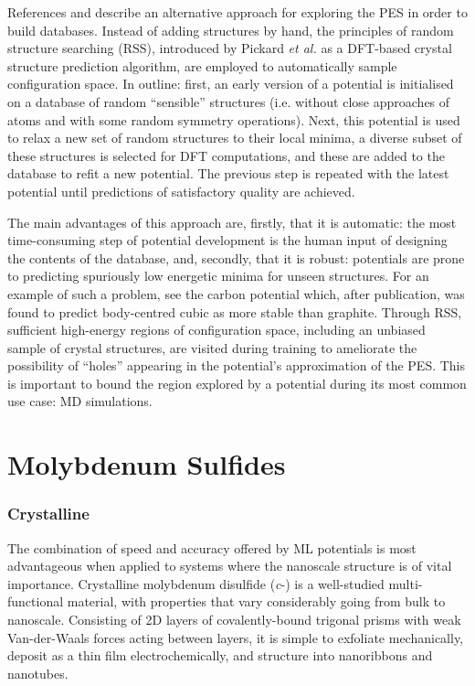 \documentclass[12pt,a4paper,twoside,nobind]{ociamthesis}
\begin{document}
References \cite{Deringer2018} and \cite{Bernstein2019b} describe an alternative approach for exploring the PES in order to build databases.
Instead of adding structures by hand, the principles of random structure searching (RSS), introduced by Pickard \emph{et al.} as a DFT-based crystal structure prediction algorithm,
are employed to automatically sample configuration space.\autocite{Pickard2006,Pickard2011} 
In outline: first, an early version of a potential is initialised on a database of random ``sensible''  structures (i.e. without close approaches of atoms and with some random
symmetry operations). 
Next, this potential is used to relax a new set of random structures to their local minima, a diverse subset of these structures is selected for DFT computations,
and these are added to the database to refit a new potential. 
The previous step is repeated with the latest potential until predictions of satisfactory quality are achieved.

The main advantages of this approach are, firstly, that it is automatic: the most time-consuming step of potential development is the human input of designing the contents of the database,
and, secondly, that it is robust: potentials are prone to predicting spuriously low energetic minima for unseen structures. For an example of such a problem, see the carbon potential\autocite{Rowe2022} which, after publication,
was found to predict body-centred cubic as more stable than graphite. %
Through RSS, sufficient high-energy regions of configuration space, including an unbiased sample of crystal structures, are visited during training to ameliorate the possibility of ``holes'' appearing in the potential's approximation of the PES.
This is important to bound the region explored by a potential during its most common use case: MD simulations.
% 
%

\section{Molybdenum Sulfides}

\subsubsection*{Crystalline }
The combination of speed and accuracy offered by ML potentials is most advantageous when applied to systems
where the nanoscale structure is of vital importance.
Crystalline molybdenum disulfide (\textit{c}-) is a well-studied multi-functional material, with properties that 
vary considerably going from bulk to nanoscale.\autocite{Ganatra2014} Consisting of 2D layers of covalently-bound  trigonal prisms with weak Van-der-Waals forces acting between layers,
it is simple to exfoliate mechanically, deposit as a thin film electrochemically, and structure into nanoribbons and nanotubes. 
\end{document}
